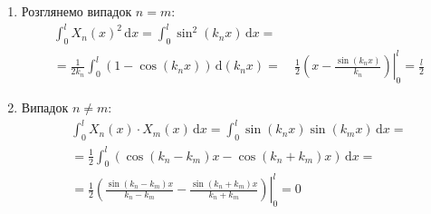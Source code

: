 \begin{enumerate}[wide, labelindent=0pt]
    \item Розглянемо випадок $n=m$:
    \begin{equation*}
        \begin{aligned}
            \int_0^l X_n(x)^2 \,\mathrm{d}x = \int_0^l \sin^2(k_n x) \,\mathrm{d}x =&\\
            =\frac{1}{2k_n} \int_0^l (1 - \cos(k_n x)) \,\mathrm{d}(k_n x) =&\ \frac{1}{2}\left.\left(x - \frac{\sin(k_n x)}{k_n}\right)\right|_0^l = \frac{l}{2}
        \end{aligned}
    \end{equation*}
    \item Випадок $n \neq m$:
    \begin{equation*}
        \begin{aligned}
            \int_0^l X_n(x) \cdot X_m(x) \,\mathrm{d}x = \int_0^l \sin(k_n x)\sin(k_m x) \,\mathrm{d}x =\\
            = \frac{1}{2} \int_0^l (\cos(k_n - k_m)x - \cos(k_n + k_m)x) \,\mathrm{d}x =\\
            = \frac{1}{2}\left.\left(\frac{\sin(k_n - k_m)x}{k_n - k_m} - \frac{\sin(k_n + k_m)x}{k_n + k_m}\right)\right|_0^l = 0
        \end{aligned}
    \end{equation*}
\end{enumerate}

